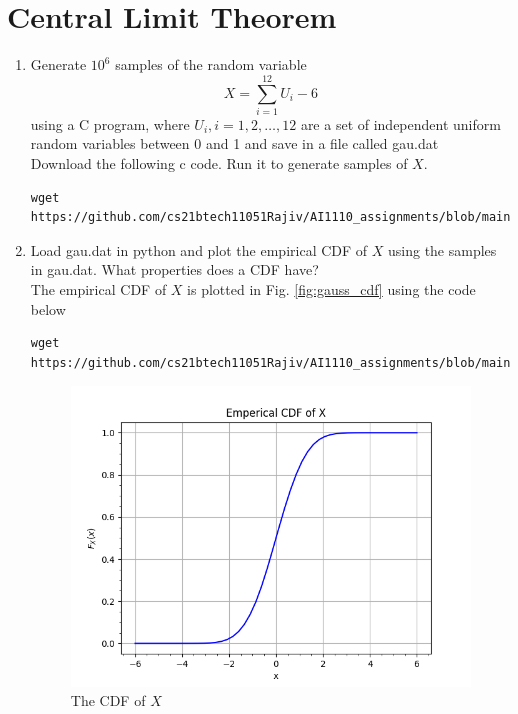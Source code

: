 \documentclass[journal,12pt,twocolumn]{IEEEtran}
\renewcommand\thesection{\arabic{section}}
\begin{document}
\section{Central Limit Theorem}
%
\begin{enumerate}[label=\thesection.\arabic*
,ref=\thesection.\theenumi]
%
\item
Generate $10^6$ samples of the random variable
%
\begin{equation}
X = \sum_{i=1}^{12}U_i -6
\end{equation}
%
using a C program, where $U_i, i = 1,2,\dots, 12$ are  a set of independent uniform random variables between 0 and 1
and save in a file called gau.dat
\\
\solution Download the following c code. Run it to generate samples of $X$.
\begin{lstlisting}
wget https://github.com/cs21btech11051Rajiv/AI1110_assignments/blob/main/manual1/q1/2p1.c
\end{lstlisting}
%
\item
Load gau.dat in python and plot the empirical CDF of $X$ using the samples in gau.dat. What properties does a CDF have?
\\
\solution The empirical CDF of $X$ is plotted in Fig. \ref{fig:gauss_cdf} using the code below
\begin{lstlisting}
wget https://github.com/cs21btech11051Rajiv/AI1110_assignments/blob/main/manual1/q1/2p2.py
\end{lstlisting}
\begin{figure}
\centering
\includegraphics[width=\columnwidth]{./figs/fig2.2.png}
\caption{The CDF of $X$}

\end{figure}
\end{enumerate}
\end{document}
